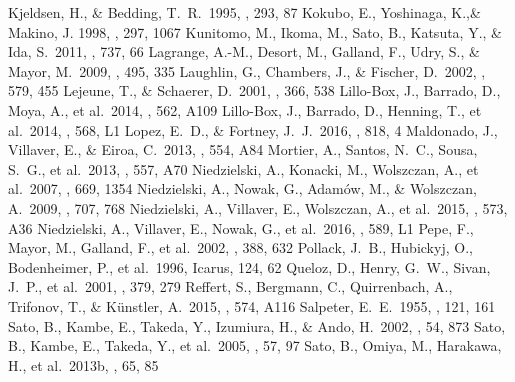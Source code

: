 \documentclass[]{pasj01}
\begin{document}
\begin{thebibliography}{}
Kjeldsen, H., \& Bedding, T.~R.\ 1995, \aap, 293, 87 
Kokubo, E., Yoshinaga, K.,\& Makino, J. 1998, \mnras, 297, 1067
Kunitomo, M., Ikoma, M., Sato, B., Katsuta, Y., \& Ida, S.\ 2011, \apj, 737, 66 
Lagrange, A.-M., Desort, M., Galland, F., Udry, S., \& Mayor, M.\ 2009, \aap, 495, 335 
Laughlin, G., Chambers, J., \& Fischer, D.\ 2002, \apj, 579, 455 
Lejeune, T., \& Schaerer, D.\ 2001, \aap, 366, 538 
Lillo-Box, J., Barrado, D., Moya, A., et al.\ 2014, \aap, 562, A109 
Lillo-Box, J., Barrado, D., Henning, T., et al.\ 2014, \aap, 568, L1 
Lopez, E.~D., \& Fortney, J.~J.\ 2016, \apj, 818, 4 
Maldonado, J., Villaver, E., \& Eiroa, C.\ 2013, \aap, 554, A84 
Mortier, A., Santos, N.~C., Sousa, S.~G., et al.\ 2013, \aap, 557, A70 
Niedzielski, A., Konacki, M., Wolszczan, A., et al.\ 2007, \apj, 669, 1354 
Niedzielski, A., Nowak, G., Adam{\'o}w, M., \& Wolszczan, A.\ 2009, \apj, 707, 768 
Niedzielski, A., Villaver, E., Wolszczan, A., et al.\ 2015, \aap, 573, A36 
Niedzielski, A., Villaver, E., Nowak, G., et al.\ 2016, \aap, 589, L1 
Pepe, F., Mayor, M., Galland, F., et al.\ 2002, \aap, 388, 632 
Pollack, J.~B., Hubickyj, O., Bodenheimer, P., et al.\ 1996, Icarus, 124, 62 
Queloz, D., Henry, G.~W., Sivan, J.~P., et al.\ 2001, \aap, 379, 279 
Reffert, S., Bergmann, C., Quirrenbach, A., Trifonov, T., \& K{\"u}nstler, A.\ 2015, \aap, 574, A116
Salpeter, E.~E.\ 1955, \apj, 121, 161 
Sato, B., Kambe, E., Takeda, Y., Izumiura, H., \& Ando, H.\ 2002, \pasj, 54, 873 
Sato, B., Kambe, E., Takeda, Y., et al.\ 2005, \pasj, 57, 97
Sato, B., Omiya, M., Harakawa, H., et al.\ 2013b, \pasj, 65, 85 

\end{thebibliography}
\end{document}
